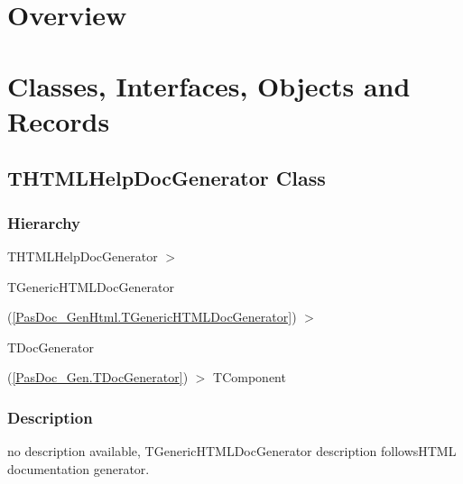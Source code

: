 \documentclass{report}
\newif\ifpdf
\begin{document}
\section{Overview}
\begin{description}
\item[\texttt{\begin{ttfamily}THTMLHelpDocGenerator\end{ttfamily} Class}]
\end{description}
\section{Classes, Interfaces, Objects and Records}
\ifpdf
\subsection*{\large{\textbf{THTMLHelpDocGenerator Class}}\normalsize\hspace{1ex}\hrulefill}
\else
\subsection*{THTMLHelpDocGenerator Class}
\fi
\label{PasDoc_GenHtmlHelp.THTMLHelpDocGenerator}
\subsubsection*{\large{\textbf{Hierarchy}}\normalsize\hspace{1ex}\hfill}
THTMLHelpDocGenerator {$>$} \begin{ttfamily}TGenericHTMLDocGenerator\end{ttfamily}(\ref{PasDoc_GenHtml.TGenericHTMLDocGenerator}) {$>$} \begin{ttfamily}TDocGenerator\end{ttfamily}(\ref{PasDoc_Gen.TDocGenerator}) {$>$} 
TComponent
\subsubsection*{\large{\textbf{Description}}\normalsize\hspace{1ex}\hfill}
no description available, TGenericHTMLDocGenerator description followsHTML documentation generator.\hfill\vspace*{1ex}
\end{document}
